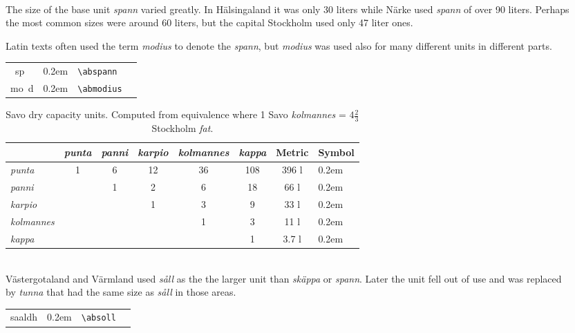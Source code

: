 \documentclass[a4paper]{article}
\newcommand{\samplefont}{\fontsize{16}{16}\abcursivefamily\spaceskip0.2em}
\newcommand{\sample}[1]{{\samplefont #1 \strut}}
\newcommand{\ltxncmd}[1]{\texttt{\textbackslash{}#1}}
\begin{document}
\begin{description}
\item [\sample{\abspann}, \sample{\abmodius}
  \emph{spann}, \emph{panni}, \emph{modius}] \mbox{} \\
  The size of the base unit \emph{spann} varied greatly. In
  Hälsingaland it was only 30 liters while Närke used \emph{spann} of
  over 90 liters. Perhaps the most common sizes were around 60 liters,
  but the capital Stockholm used only 47 liter ones.

  Latin texts often used the term \emph{modius} to denote the
  \emph{spann}, but \emph{modius} was used also for many different
  units in different parts.
    \begin{center}
    \begin{tabular}{llll}
      {}~sp  & \sample{\abspann} & \ltxncmd{abspann} \\
      {}mo~d & \sample{\abmodius} & \ltxncmd{abmodius} \\
    \end{tabular}
  \end{center}


\begin{table}
\begin{tabular}{lccccc|cl}
  & \emph{punta} & \emph{panni} & \emph{karpio} & \emph{kolmannes} & \emph{kappa} & Metric &  Symbol \\
  \hline
  \emph{punta}      & 1 &  6 & 12 & 36 & 108 & 396 l & \sample{\abpundthree}\\
  \emph{panni}     &   &  1 &  2 &  6 &  18 & 66 l & \sample{\abspann} \\
  \emph{karpio}    &   &    &  1 &  3 &   9 & 33 l & \sample{\abkarpio}\\
  \emph{kolmannes} &   &    &    &  1 &   3 & 11 l & \sample{\abkolmannes} \\
  \emph{kappa}     &   &    &    &    &   1 & 3.7 l & \sample{\abkappa}\\
\end{tabular}
\caption{Savo dry capacity units. Computed from equivalence where 1
  Savo \emph{kolmannes} = $4\frac{2}{3}$ Stockholm \emph{fat}.}
  \label{tab:savo_volume}
\end{table}



\item [\sample{\absoll} \emph{såll}, \emph{cribrum}] \mbox{} \\
  Västergotaland and Värmland used \emph{såll} as the the larger unit
  than \emph{skäppa} or \emph{spann}. Later the unit fell out of use
  and was replaced by \emph{tunna} that had the same size as
  \emph{såll} in those areas.
  \begin{center}
    \begin{tabular}{llll}
      {}saaldh & \sample{\absoll} & \ltxncmd{absoll} \\
    \end{tabular}
  \end{center}



\end{description}
\end{document}
